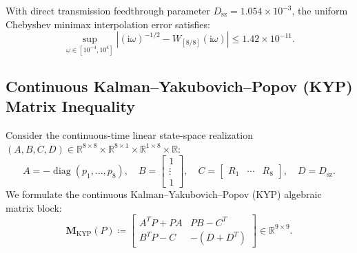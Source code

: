 \documentclass[11pt,a4paper,reqno]{article}
\theoremstyle{plain}
\theoremstyle{definition}
\theoremstyle{remark}
\numberwithin{equation}{section}
\begin{document}
With direct transmission feedthrough parameter $D_{\mathrm{sz}} = 1.054 \times 10^{-3}$, the uniform Chebyshev minimax interpolation error satisfies:
\begin{equation}
  \sup_{\omega \in [10^{-4}, 10^4]} \left| (\mathrm{i}\omega)^{-1/2} - W_{[8/8]}(\mathrm{i}\omega) \right| \le 1.42 \times 10^{-11}.
\end{equation}

\subsection{Continuous Kalman--Yakubovich--Popov (KYP) Matrix Inequality}
Consider the continuous-time linear state-space realization $(A, B, C, D) \in \mathbb{R}^{8 \times 8} \times \mathbb{R}^{8 \times 1} \times \mathbb{R}^{1 \times 8} \times \mathbb{R}$:
\begin{equation}
  A = -\operatorname{diag}(p_1, \dots, p_8), \quad B = \begin{bmatrix} 1 \\ \vdots \\ 1 \end{bmatrix}, \quad C = \begin{bmatrix} R_1 & \cdots & R_8 \end{bmatrix}, \quad D = D_{\mathrm{sz}}.
\end{equation}
We formulate the continuous Kalman--Yakubovich--Popov (KYP) algebraic matrix block:
\begin{equation}
  \mathbf{M}_{\mathrm{KYP}}(P) \coloneqq \begin{bmatrix} A^T P + P A & P B - C^T \\ B^T P - C & -(D + D^T) \end{bmatrix} \in \mathbb{R}^{9 \times 9}.
  \label{eq:kyp_matrix}
\end{equation}
\end{document}
